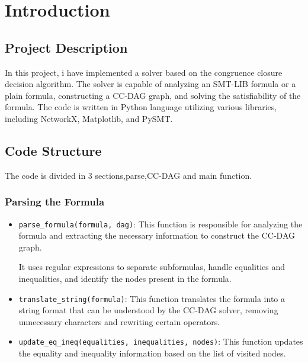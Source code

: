 \documentclass[11pt]{report}
\begin{document}
\maketitle

\chapter*{Introduction}
\section*{Project Description}
In this project, i have implemented a solver based on the congruence closure decision algorithm. The solver is capable of analyzing an SMT-LIB formula or a plain formula, constructing a CC-DAG graph, and solving the satisfiability of the formula. The code is written in Python language utilizing various libraries, including NetworkX, Matplotlib, and PySMT.


\section*{Code Structure}
The code is divided in 3 sections,parse,CC-DAG and main function.

\subsection*{Parsing the Formula}
\begin{itemize}
    \item \texttt{parse\_formula(formula, dag)}: This function is responsible for analyzing the formula and extracting the necessary information to construct the CC-DAG graph.
    
    It uses regular expressions to separate subformulas, handle equalities and inequalities, and identify the nodes present in the formula.
    
    \item \texttt{translate\_string(formula)}: This function translates the formula into a string format that can be understood by the CC-DAG solver, removing unnecessary characters and rewriting certain operators.
    \item \texttt{update\_eq\_ineq(equalities, inequalities, nodes)}: This function updates the equality and inequality information based on the list of visited nodes.
    
\end{itemize}
\end{document}

